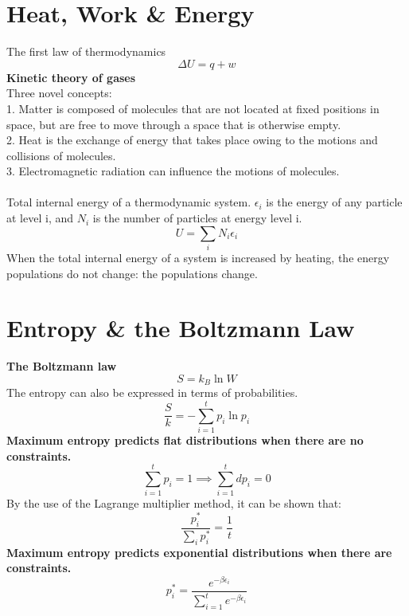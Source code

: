 \documentclass[8pt]{article}
\numberwithin{equation}{section}
\begin{document}
\begin{multicols}{2}
\section{Heat, Work \& Energy}
The first law of thermodynamics  
\begin{equation}
\Delta U=q+w  \tag{p. 49} 
\end{equation}
\textbf{Kinetic theory of gases}\\
Three novel concepts: \\
1. Matter is composed of molecules that are not located at fixed positions in space, but are free to move through a space that is otherwise empty. \\
2. Heat is the exchange of energy that takes place owing to the motions and collisions of molecules. \\ 3. Electromagnetic radiation can influence the motions of molecules. \\\\
Total internal energy of a thermodynamic system. $\epsilon_{i}$ is the energy of any particle at level i, and $N_{i}$ is the number of particles at energy level i. 
\begin{equation} \tag{3.12}
U=\sum_{i} N_{i} \epsilon_{i}
\end{equation}
When the total internal energy of a system is increased by heating, the energy populations do not change: the populations change. 

\setcounter{section}{4}
\section{Entropy \& the Boltzmann Law}
\textbf{The Boltzmann law}
\begin{equation}
S=k_{B} \ln{W} \label{eq:5.1}
\end{equation}
The entropy can also be expressed in terms of probabilities. 
\begin{equation}
\frac{S}{k}=-\sum_{i=1}^{t} p_{i}\ln{p_{i}}
\end{equation}
\textbf{Maximum entropy predicts flat distributions when there are no constraints.} 
\begin{equation}
\sum_{i=1}^{t} p_{i}=1 \implies \sum_{i=1}^{t}dp_{i}=0 \tag{5.5}
\end{equation}
By the use of the Lagrange multiplier method, it can be shown that: 
\begin{equation}
\frac{p_{i}^{*}}{\sum_{i}p_{i}^{*}}=\frac{1}{t} \tag{5.9}
\end{equation}
\textbf{Maximum entropy predicts exponential distributions when there are constraints.}
\begin{equation}
p_{i}^{*}=\frac{e^{-\beta \epsilon_{i}}}{\sum_{i=1}^{t}e^{-\beta \epsilon_{i}}} \tag{5.17}
\end{equation} 

\end{multicols}
\end{document}

